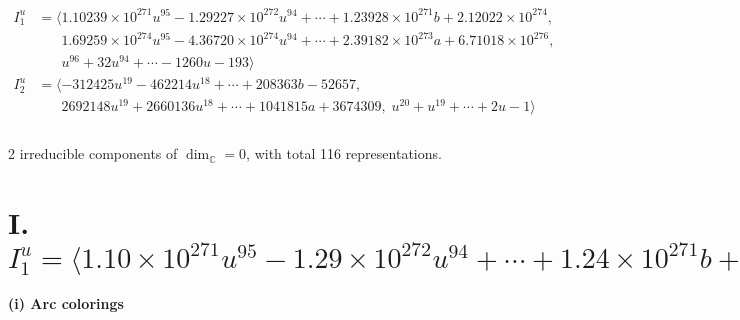 \documentclass[1p]{elsarticle_modified}
\theoremstyle{definition}
\begin{document}
\begin{align*}
I^u_{1}&=\langle 
1.10239\times10^{271} u^{95}-1.29227\times10^{272} u^{94}+\cdots+1.23928\times10^{271} b+2.12022\times10^{274},\\
\phantom{I^u_{1}}&\phantom{= \langle  }1.69259\times10^{274} u^{95}-4.36720\times10^{274} u^{94}+\cdots+2.39182\times10^{273} a+6.71018\times10^{276},\\
\phantom{I^u_{1}}&\phantom{= \langle  }u^{96}+32 u^{94}+\cdots-1260 u-193\rangle \\
I^u_{2}&=\langle 
-312425 u^{19}-462214 u^{18}+\cdots+208363 b-52657,\\
\phantom{I^u_{2}}&\phantom{= \langle  }2692148 u^{19}+2660136 u^{18}+\cdots+1041815 a+3674309,\;u^{20}+u^{19}+\cdots+2 u-1\rangle \\
\\
\end{align*}
\raggedright * 2 irreducible components of $\dim_{\mathbb{C}}=0$, with total 116 representations.\\
\newpage
\renewcommand{\arraystretch}{1}
\centering \section*{I. $I^u_{1}= \langle 1.10\times10^{271} u^{95}-1.29\times10^{272} u^{94}+\cdots+1.24\times10^{271} b+2.12\times10^{274},\;1.69\times10^{274} u^{95}-4.37\times10^{274} u^{94}+\cdots+2.39\times10^{273} a+6.71\times10^{276},\;u^{96}+32 u^{94}+\cdots-1260 u-193 \rangle$}
\flushleft \textbf{(i) Arc colorings}\\
\end{document}
